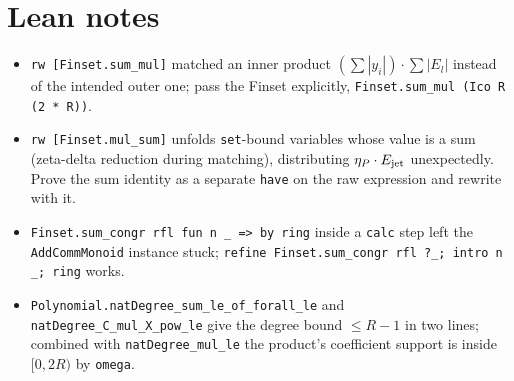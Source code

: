\documentclass[11pt]{article}
\begin{document}
\section{Lean notes}

\begin{itemize}
\item \texttt{rw [Finset.sum\_mul]} matched an inner product $(\sum|y_i|)\cdot\sum|E_l|$ instead of
the intended outer one; pass the Finset explicitly, \texttt{Finset.sum\_mul (Ico R (2 * R))}.
\item \texttt{rw [Finset.mul\_sum]} unfolds \texttt{set}-bound variables whose value is a sum
(zeta-delta reduction during matching), distributing $\eta_P\cdot E_{\rm jet}$ unexpectedly.
Prove the sum identity as a separate \texttt{have} on the raw expression and rewrite with it.
\item \texttt{Finset.sum\_congr rfl fun n \_ => by ring} inside a \texttt{calc} step left the
\texttt{AddCommMonoid} instance stuck; \texttt{refine Finset.sum\_congr rfl ?\_; intro n \_; ring}
works.
\item \texttt{Polynomial.natDegree\_sum\_le\_of\_forall\_le} and
\texttt{natDegree\_C\_mul\_X\_pow\_le} give the degree bound $\le R-1$ in two lines; combined with
\texttt{natDegree\_mul\_le} the product's coefficient support is inside $[0,2R)$ by \texttt{omega}.
\end{itemize}
\end{document}
